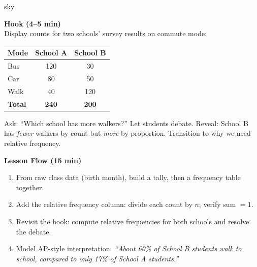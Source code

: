 \documentclass[10pt]{article}
\begin{document}
\begin{skillbox}{sky}
\begin{minipage}[t]{0.48\linewidth}
    \textbf{Hook (4--5 min)}\\
    Display counts for two schools' survey results on commute mode:
    \begin{center}
    \small\renewcommand{\arraystretch}{1.3}
    \begin{tabular}{lcc}
    \hline
    Mode & School A & School B \\ \hline
    Bus  & 120 & 30 \\
    Car  & 80  & 50 \\
    Walk & 40  & 120 \\ \hline
    \textbf{Total} & \textbf{240} & \textbf{200} \\
    \hline
    \end{tabular}
    \end{center}
    Ask: ``Which school has more walkers?'' Let students debate. Reveal: School B
    has \textit{fewer} walkers by count but \textit{more} by proportion. Transition
    to why we need relative frequency.
\end{minipage}
\hfill
\begin{minipage}[t]{0.48\linewidth}
    \textbf{Lesson Flow (15 min)}
    \begin{enumerate}
        \item From raw class data (birth month), build a tally, then a frequency
              table together.
        \item Add the relative frequency column: divide each count by $n$; verify
              sum $= 1$.
        \item Revisit the hook: compute relative frequencies for both schools and
              resolve the debate.
        \item Model AP-style interpretation:
              \textit{``About 60\% of School B students walk to school, compared
              to only 17\% of School A students.''}
    \end{enumerate}
\end{minipage}
\end{skillbox}
\end{document}
